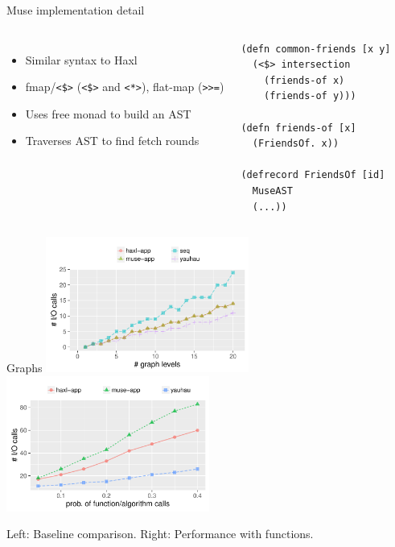 \documentclass[utf8x,10pt,aspectratio=169]{beamer}
\begin{document}
\begin{frame}[fragile]{Muse implementation detail}
	\begin{columns}
		\begin{itemize}
			\item Similar syntax to Haxl
			\item fmap/\texttt{<\$>} (\texttt{<\$>} and \texttt{<*>}), flat-map (\texttt{>>=})
			\item Uses free monad to build an AST
			\item Traverses AST to find fetch rounds
		\end{itemize}
		\begin{verbatim}
(defn common-friends [x y]
  (<$> intersection 
    (friends-of x) 
    (friends-of y)))

(defn friends-of [x]
  (FriendsOf. x))
  
(defrecord FriendsOf [id]
  MuseAST
  (...))
		\end{verbatim}
	\end{columns}

\end{frame}

\begin{frame}{Graphs}
	\includegraphics[width=0.5\textwidth]{plots/baseline}
	\includegraphics[width=0.5\textwidth]{plots/functions}
	
	Left: Baseline comparison. Right: Performance with functions.

\end{frame}
\end{document}
